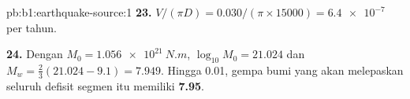 \begin{solution}{pb:b1:earthquake-source:1}
\textbf{23.} $V/(\pi D) = \num{0.030}/(\pi\times\num{15000}) = \num{6.4e-7}$
per tahun.

\textbf{24.} Dengan $M_0 = \qty{1.056e21}{N.m}$, $\log_{10}M_0 = 21.024$ dan
$M_w = \tfrac23(21.024 - 9.1) = 7.949$. Hingga 0.01, gempa bumi yang akan melepaskan seluruh
defisit segmen itu memiliki  \textbf{7.95}.
\end{solution}
